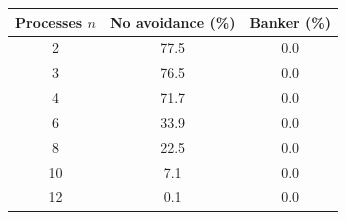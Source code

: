 \begin{tabular}{|c|c|c|}
\hline
\textbf{Processes $n$} & \textbf{No avoidance (\%)} & \textbf{Banker (\%)} \\ \hline
2 & 77.5 & 0.0 \\
3 & 76.5 & 0.0 \\
4 & 71.7 & 0.0 \\
6 & 33.9 & 0.0 \\
8 & 22.5 & 0.0 \\
10 & 7.1 & 0.0 \\
12 & 0.1 & 0.0 \\
\hline
\end{tabular}
